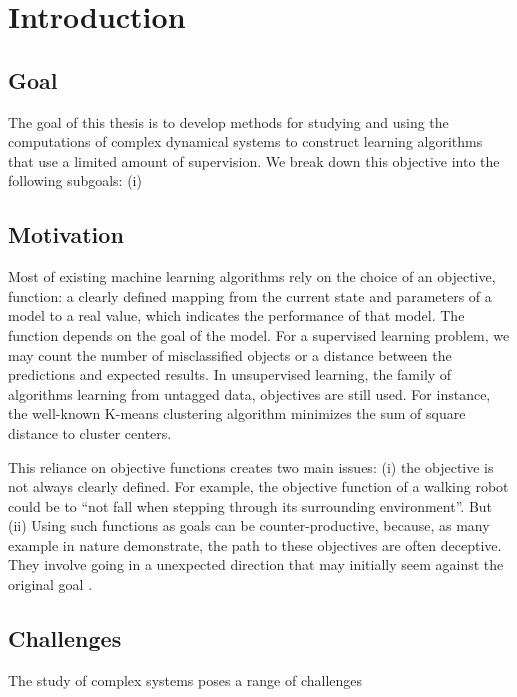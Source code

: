 \chapter{Introduction}


\section{Goal}

The goal of this thesis is to develop methods for studying and using the
computations of complex dynamical systems to construct learning algorithms that
use a limited amount of supervision.
We break down this objective into the following subgoals: (i)


\section{Motivation}

Most of existing machine learning algorithms rely on the choice of an objective,
function: a clearly defined mapping from the current state and parameters of a
model to a real value, which indicates the performance of that model. The
function depends on the goal of the model. For a supervised learning problem, we
may count the number of misclassified objects or a distance between the
predictions and expected results. In unsupervised learning, the family of
algorithms learning from untagged data, objectives are still used. For instance,
the well-known K-means clustering algorithm minimizes the sum of square distance
to cluster centers.

This reliance on objective functions creates two main
issues: (i) the objective is not always clearly defined. For example, the
objective function of a walking robot could be to ``not fall when stepping
through its surrounding environment''. But (ii) Using such functions as goals
can be counter-productive, because, as many example in nature demonstrate, the
path to these objectives are often deceptive. They involve going in a unexpected
direction that may initially seem against the original goal
\cite{stanleyWhyGreatnessCannot2015}.




\section{Challenges}

The study of complex systems poses a range of challenges

